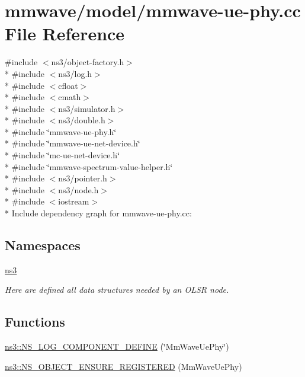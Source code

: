 \hypertarget{mmwave-ue-phy_8cc}{}\section{mmwave/model/mmwave-\/ue-\/phy.cc File Reference}
\label{mmwave-ue-phy_8cc}
{\ttfamily \#include $<$ns3/object-\/factory.\+h$>$}\\*
{\ttfamily \#include $<$ns3/log.\+h$>$}\\*
{\ttfamily \#include $<$cfloat$>$}\\*
{\ttfamily \#include $<$cmath$>$}\\*
{\ttfamily \#include $<$ns3/simulator.\+h$>$}\\*
{\ttfamily \#include $<$ns3/double.\+h$>$}\\*
{\ttfamily \#include \char`\"{}mmwave-\/ue-\/phy.\+h\char`\"{}}\\*
{\ttfamily \#include \char`\"{}mmwave-\/ue-\/net-\/device.\+h\char`\"{}}\\*
{\ttfamily \#include \char`\"{}mc-\/ue-\/net-\/device.\+h\char`\"{}}\\*
{\ttfamily \#include \char`\"{}mmwave-\/spectrum-\/value-\/helper.\+h\char`\"{}}\\*
{\ttfamily \#include $<$ns3/pointer.\+h$>$}\\*
{\ttfamily \#include $<$ns3/node.\+h$>$}\\*
{\ttfamily \#include $<$iostream$>$}\\*
Include dependency graph for mmwave-\/ue-\/phy.cc\+:
\subsection*{Namespaces}
\begin{DoxyCompactItemize}
\item 
 \hyperlink{namespacens3}{ns3}
\begin{DoxyCompactList}\small\item\em Here are defined all data structures needed by an O\+L\+SR node. \end{DoxyCompactList}\end{DoxyCompactItemize}
\subsection*{Functions}
\begin{DoxyCompactItemize}
\item 
\hyperlink{namespacens3_a73e4bc915a2d1df9289e7718fbd00b2b}{ns3\+::\+N\+S\+\_\+\+L\+O\+G\+\_\+\+C\+O\+M\+P\+O\+N\+E\+N\+T\+\_\+\+D\+E\+F\+I\+NE} (\char`\"{}Mm\+Wave\+Ue\+Phy\char`\"{})
\item 
\hyperlink{namespacens3_a2c1316d0693781388257abf447670a59}{ns3\+::\+N\+S\+\_\+\+O\+B\+J\+E\+C\+T\+\_\+\+E\+N\+S\+U\+R\+E\+\_\+\+R\+E\+G\+I\+S\+T\+E\+R\+ED} (Mm\+Wave\+Ue\+Phy)
\end{DoxyCompactItemize}
